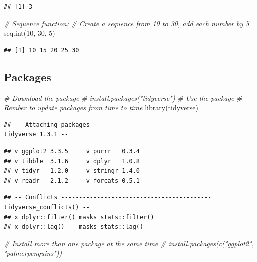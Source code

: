 \documentclass[
]{article}
\newenvironment{Shaded}{\begin{snugshade}}{\end{snugshade}}
\newcommand{\CommentTok}[1]{\textcolor[rgb]{0.56,0.35,0.01}{\textit{#1}}}
\newcommand{\DecValTok}[1]{\textcolor[rgb]{0.00,0.00,0.81}{#1}}
\newcommand{\FunctionTok}[1]{\textcolor[rgb]{0.00,0.00,0.00}{#1}}
\newcommand{\NormalTok}[1]{#1}
\begin{document}
\begin{verbatim}
## [1] 3
\end{verbatim}

\begin{Shaded}
\begin{Highlighting}[]
\CommentTok{\# Sequence function: }
\CommentTok{\# Create a sequence from 10 to 30, add each number by 5}
\FunctionTok{seq.int}\NormalTok{(}\DecValTok{10}\NormalTok{, }\DecValTok{30}\NormalTok{, }\DecValTok{5}\NormalTok{)}
\end{Highlighting}
\end{Shaded}

\begin{verbatim}
## [1] 10 15 20 25 30
\end{verbatim}

\hypertarget{packages}{%
\subsection{Packages}\label{packages}}

\begin{Shaded}
\begin{Highlighting}[]
\CommentTok{\# Download the package}
\CommentTok{\# install.packages("tidyverse")}
\CommentTok{\# Use the package}
\CommentTok{\# Rember to update packages from time to time}
\FunctionTok{library}\NormalTok{(tidyverse)}
\end{Highlighting}
\end{Shaded}

\begin{verbatim}
## -- Attaching packages --------------------------------------- tidyverse 1.3.1 --
\end{verbatim}

\begin{verbatim}
## v ggplot2 3.3.5     v purrr   0.3.4
## v tibble  3.1.6     v dplyr   1.0.8
## v tidyr   1.2.0     v stringr 1.4.0
## v readr   2.1.2     v forcats 0.5.1
\end{verbatim}

\begin{verbatim}
## -- Conflicts ------------------------------------------ tidyverse_conflicts() --
## x dplyr::filter() masks stats::filter()
## x dplyr::lag()    masks stats::lag()
\end{verbatim}

\begin{Shaded}
\begin{Highlighting}[]
\CommentTok{\# Install more than one package at the same time}
\CommentTok{\# install.packages(c("ggplot2", "palmerpenguins"))}
\end{Highlighting}
\end{Shaded}
\end{document}

